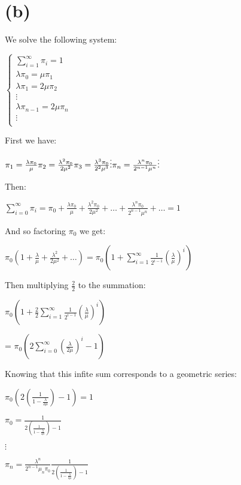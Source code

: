 \documentclass[]{article}
\begin{document}
\hypertarget{b-1}{%
\section{(b)}\label{b-1}}

We solve the following system:

\(\begin{cases} \sum_{i = 1}^{\infty} \pi_i = 1 \\ \lambda \pi_0 = \mu \pi_1 \\ \lambda \pi_1 = 2 \mu \pi_2 \\ \vdots \\ \lambda \pi_{n-1} = 2 \mu \pi_n \\ \vdots \\ \end{cases}\)

First we have:

\(\pi_1 = \frac{\lambda \pi_0}{\mu} \\ \pi_2 = \frac{\lambda^2 \pi_0}{2 \mu^2} \\ \pi_3 = \frac{\lambda^3 \pi_0}{2^2 \mu^3} \\ \vdots \\ \pi_n = \frac{\lambda^n \pi_0}{2^{n-1} \mu^n} \\ \vdots\)

Then:

\(\sum_{i=0}^{\infty} \pi_i = \pi_0 + \frac{\lambda \pi_0}{\mu} + \frac{\lambda^2 \pi_0}{2 \mu^2} + \dots + \frac{\lambda^n \pi_0}{2^{n-1} \mu^n} + \dots = 1\)

And so factoring \(\pi_0\) we get:

\(\pi_0 (1 + \frac{\lambda}{\mu} + \frac{\lambda^2}{2 \mu^2} + \dots) = \pi_0 (1 + \sum_{i=1}^{\infty} \frac{1}{2^{i-1}} (\frac{\lambda}{\mu})^{i})\)

Then multiplying \(\frac{2}{2}\) to the summation:

\(\pi_0 (1 + \frac{2}{2} \sum_{i=1}^{\infty} \frac{1}{2^{i-1}} (\frac{\lambda}{\mu})^{i})\)

= \(\pi_0 (2 \sum_{i=0}^{\infty} (\frac{\lambda}{2 \mu})^{i} - 1)\)

Knowing that this infite sum corresponds to a geometric series:

\(\pi_0 (2 (\frac{1}{1 - \frac{\lambda}{2 \mu}}) - 1) = 1\)

\(\pi_0 = \frac{1}{2 (\frac{1}{1 - \frac{\lambda}{2 \mu}}) - 1}\)

\(\vdots\)

\(\pi_n = \frac{\lambda^n}{2^{n-1}{\mu_n} \pi_0} \frac{1}{2 (\frac{1}{1 - \frac{\lambda}{2 \mu}}) - 1}\)
\end{document}
